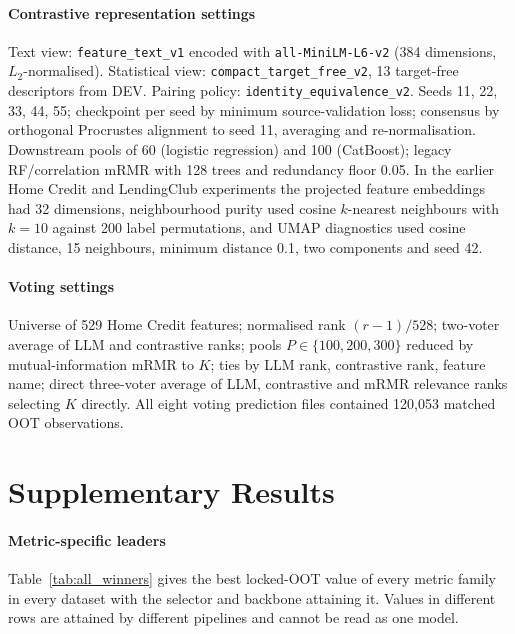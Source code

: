 \documentclass[preprint,12pt]{elsarticle}
\newcommand{\Kfeat}{K}
\begin{document}
\paragraph{Contrastive representation settings}
\begin{sloppypar}
Text view: \texttt{feature\_text\_v1} encoded with \texttt{all-MiniLM-L6-v2} (384 dimensions, $L_2$-normalised). Statistical view: \texttt{compact\_target\_free\_v2}, 13 target-free descriptors from DEV. Pairing policy: \texttt{identity\_equivalence\_v2}. Seeds 11, 22, 33, 44, 55; checkpoint per seed by minimum source-validation loss; consensus by orthogonal Procrustes alignment to seed 11, averaging and re-normalisation. Downstream pools of 60 (logistic regression) and 100 (CatBoost); legacy RF/correlation mRMR with 128 trees and redundancy floor 0.05. In the earlier Home Credit and LendingClub experiments the projected feature embeddings had 32 dimensions, neighbourhood purity used cosine $k$-nearest neighbours with $k=10$ against 200 label permutations, and UMAP diagnostics used cosine distance, 15 neighbours, minimum distance 0.1, two components and seed 42.
\end{sloppypar}

\paragraph{Voting settings}
\begin{sloppypar}
Universe of 529 Home Credit features; normalised rank $(r-1)/528$; two-voter average of LLM and contrastive ranks; pools $P\in\{100,200,300\}$ reduced by mutual-information mRMR to $\Kfeat$; ties by LLM rank, contrastive rank, feature name; direct three-voter average of LLM, contrastive and mRMR relevance ranks selecting $\Kfeat$ directly. All eight voting prediction files contained 120,053 matched OOT observations.
\end{sloppypar}

\section{Supplementary Results}
\label{app:supplementary}
\setcounter{table}{0}

\paragraph{Metric-specific leaders}
Table~\ref{tab:all_winners} gives the best locked-OOT value of every metric family in every dataset with the selector and backbone attaining it. Values in different rows are attained by different pipelines and cannot be read as one model.
\end{document}
